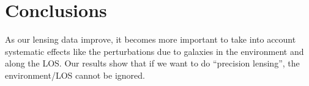 \section{Conclusions}
As our lensing data improve, it becomes more important to take into account systematic effects like the perturbations due to galaxies in the environment and along the LOS. Our results show that if we want to do ``precision lensing'', the environment/LOS cannot be ignored.